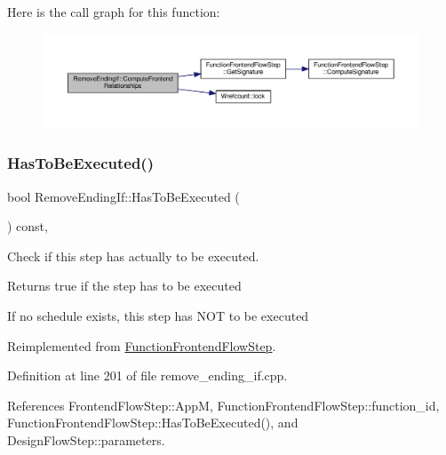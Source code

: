 Here is the call graph for this function\+:
\nopagebreak
\begin{figure}[H]
\begin{center}
\leavevmode
\includegraphics[width=350pt]{d3/d05/classRemoveEndingIf_a028dba75b4b90e6a322030b4a2d6eebe_cgraph}
\end{center}
\end{figure}
\mbox{\label{classRemoveEndingIf_a02a434d8972c1582197d7e12f136c652}} 
\subsubsection{\texorpdfstring{Has\+To\+Be\+Executed()}{HasToBeExecuted()}}
{\footnotesize\ttfamily bool Remove\+Ending\+If\+::\+Has\+To\+Be\+Executed (\begin{DoxyParamCaption}{ }\end{DoxyParamCaption}) const\hspace{0.3cm}{\ttfamily [override]}, {\ttfamily [virtual]}}



Check if this step has actually to be executed. 

\begin{DoxyReturn}{Returns}
true if the step has to be executed 
\end{DoxyReturn}
If no schedule exists, this step has N\+OT to be executed 

Reimplemented from \hyperlink{classFunctionFrontendFlowStep_a12e786363530aa9533e4bd9380130d75}{Function\+Frontend\+Flow\+Step}.



Definition at line 201 of file remove\+\_\+ending\+\_\+if.\+cpp.



References Frontend\+Flow\+Step\+::\+AppM, Function\+Frontend\+Flow\+Step\+::function\+\_\+id, Function\+Frontend\+Flow\+Step\+::\+Has\+To\+Be\+Executed(), and Design\+Flow\+Step\+::parameters.

